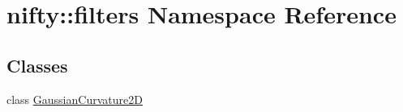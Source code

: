 \hypertarget{namespacenifty_1_1filters}{}\section{nifty\+:\+:filters Namespace Reference}
\label{namespacenifty_1_1filters}
\subsection*{Classes}
\begin{DoxyCompactItemize}
\item 
class \hyperlink{classnifty_1_1filters_1_1GaussianCurvature2D}{Gaussian\+Curvature2\+D}
\end{DoxyCompactItemize}

